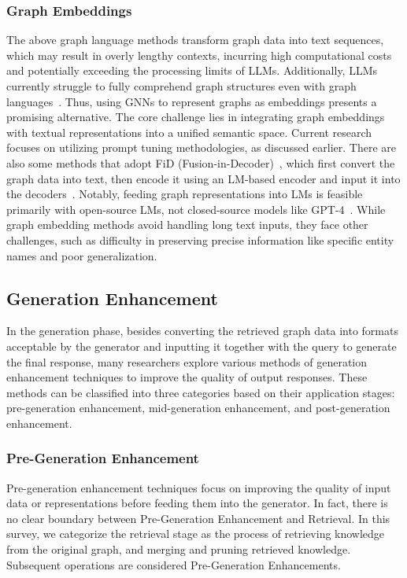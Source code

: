 \documentclass[acmsmall]{acmart}
\begin{document}
\subsubsection{Graph Embeddings}
The above graph language methods transform graph data into text sequences, which may result in overly lengthy contexts, incurring high computational costs and potentially exceeding the processing limits of LLMs. Additionally, LLMs currently struggle to fully comprehend graph structures even with graph languages~\cite{ref:gpt4graph}. Thus, using GNNs to represent graphs as embeddings presents a promising alternative. The core challenge lies in integrating graph embeddings with textual representations into a unified semantic space. Current research focuses on utilizing prompt tuning methodologies, as discussed earlier. There are also some methods that adopt FiD (Fusion-in-Decoder)~\cite{ref:fid,ref:kgfid}, which first convert the graph data into text, then encode it using an LM-based encoder and input it into the decoders~\cite{ref:reano,ref:decaf,ref:skp}. Notably, feeding graph representations into LMs is feasible primarily with open-source LMs, not closed-source models like GPT-4~\cite{ref:gpt4}. While graph embedding methods avoid handling long text inputs, they face other challenges, such as difficulty in preserving precise information like specific entity names and poor generalization.

\subsection{Generation Enhancement}
In the generation phase, besides converting the retrieved graph data into formats acceptable by the generator and inputting it together with the query to generate the final response, many researchers explore various methods of generation enhancement techniques to improve the quality of output responses. These methods can be classified into three categories based on their application stages: pre-generation enhancement, mid-generation enhancement, and post-generation enhancement.

\subsubsection{Pre-Generation Enhancement}
Pre-generation enhancement techniques focus on improving the quality of input data or representations before feeding them into the generator. In fact, there is no clear boundary between Pre-Generation Enhancement and Retrieval. In this survey, we categorize the retrieval stage as the process of retrieving knowledge from the original graph, and merging and pruning retrieved knowledge. Subsequent operations are considered Pre-Generation Enhancements. 
\end{document}

